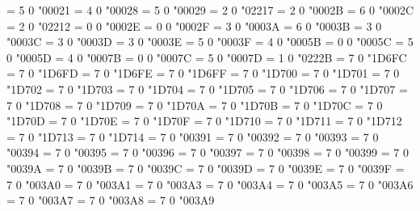   = 5 0 "00021 %
  = 4 0 "00028 %
  = 5 0 "00029 %
  = 2 0 "02217 %
  = 2 0 "0002B %
  = 6 0 "0002C %
  = 2 0 "02212 %
  = 0 0 "0002E %
  = 0 0 "0002F %
  = 3 0 "0003A %
  = 6 0 "0003B %
  = 3 0 "0003C %
  = 3 0 "0003D %
  = 3 0 "0003E %
  = 5 0 "0003F %
  = 4 0 "0005B %
  = 0 0 "0005C %
  = 5 0 "0005D %
 = 4 0 "0007B %
 = 0 0 "0007C %
 = 5 0 "0007D %
 = 1 0 "0222B %
\Umathchardef\alpha = 7 0 "1D6FC
\Umathchardef\beta = 7 0 "1D6FD
\Umathchardef\gamma = 7 0 "1D6FE
\Umathchardef\delta = 7 0 "1D6FF
\Umathchardef\epsilon = 7 0 "1D700
\Umathchardef\zeta = 7 0 "1D701
\Umathchardef\eta = 7 0 "1D702
\Umathchardef\theta = 7 0 "1D703
\Umathchardef\iota = 7 0 "1D704
\Umathchardef\kappa = 7 0 "1D705
\Umathchardef\lambda = 7 0 "1D706
\Umathchardef\mu = 7 0 "1D707
\Umathchardef\nu = 7 0 "1D708
\Umathchardef\xi = 7 0 "1D709
\Umathchardef\omicron = 7 0 "1D70A
\Umathchardef\pi = 7 0 "1D70B
\Umathchardef\rho = 7 0 "1D70C
\Umathchardef\varsigma = 7 0 "1D70D
\Umathchardef\sigma = 7 0 "1D70E
\Umathchardef\tau = 7 0 "1D70F
\Umathchardef\upsilon = 7 0 "1D710
\Umathchardef\phi = 7 0 "1D711
\Umathchardef\chi = 7 0 "1D712
\Umathchardef\psi = 7 0 "1D713
\Umathchardef\omega = 7 0 "1D714
\Umathchardef\Alpha = 7 0 "00391
\Umathchardef\Beta = 7 0 "00392
\Umathchardef\Gamma = 7 0 "00393
\Umathchardef\Delta = 7 0 "00394
\Umathchardef\Epsilon = 7 0 "00395
\Umathchardef\Zeta = 7 0 "00396
\Umathchardef\Eta = 7 0 "00397
\Umathchardef\Theta = 7 0 "00398
\Umathchardef\Iota = 7 0 "00399
\Umathchardef\Kappa = 7 0 "0039A
\Umathchardef\Lambda = 7 0 "0039B
\Umathchardef\Mu = 7 0 "0039C
\Umathchardef\Nu = 7 0 "0039D
\Umathchardef\Xi = 7 0 "0039E
\Umathchardef\Omicron = 7 0 "0039F
\Umathchardef\Pi = 7 0 "003A0
\Umathchardef\Rho = 7 0 "003A1
\Umathchardef\Sigma = 7 0 "003A3
\Umathchardef\Tau = 7 0 "003A4
\Umathchardef\Upsilon = 7 0 "003A5
\Umathchardef\Phi = 7 0 "003A6
\Umathchardef\Chi = 7 0 "003A7
\Umathchardef\Psi = 7 0 "003A8
\Umathchardef\Omega = 7 0 "003A9


